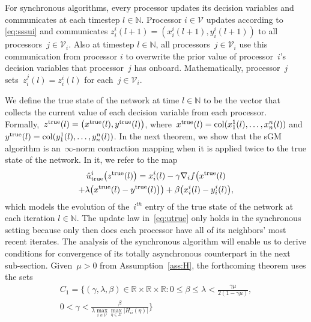 \documentclass[9pt,shortpaper,twoside,web]{ieeecolor}
\newcommand{\R}{\ensuremath{\mathbb{R}}\xspace}
\newcommand{\X}{\ensuremath{\mathcal{X}}\xspace}
\newcommand{\V}{\ensuremath{\mathcal{V}}\xspace}
\newcommand{\col}[2]{\textnormal{col}(#1,#2)}
\newcommand{\tr}{\textnormal{true}}
\begin{document}
For synchronous algorithms, every processor updates its decision variables and communicates at each timestep $l\in\mathbb{N}$.
Processor $i\in\V$ updates according to \eqref{eq:sssui} and communicates $z^i_i(l+1)=(x^i_i(l+1),y^i_i(l+1))$ to all 
processors~$j \in \V_i$.
Also at timestep $l\in\mathbb{N}$, all processors~$j \in \V_i$ use this communication from processor $i$ 
to overwrite the prior value of processor~$i$'s decision variables that processor~$j$ has onboard.
Mathematically, processor~$j$ sets~$z^j_i(l) = z^i_i(l)$ for each~$j \in \V_i$.

We define the true state of the network 
 at time $l\in\mathbb{N}$ to be the vector that collects the current value of each decision variable from each processor.
 Formally,~$z^\tr(l)= \big(x^\tr(l),y^\tr(l)\big)$, where~$x^\tr(l)=\col{x^1_1(l),\dots}{x^n_n(l)}$ and~$y^\tr(l) =\col{y^1_1(l),\dots}{y^n_n(l)}$.
In the next theorem, we show that the sGM algorithm is an~$\infty$-norm contraction mapping when it is applied
twice to the true state of the network.
In it, we refer to the map 
\begin{multline}\label{eq:utrue}
    \hat{u}^i_\tr\big(z^\tr(l)\big) = x^i_i(l)-\gamma\nabla_i f\big(x^\tr(l)\\+\lambda\big(x^\tr(l)-y^\tr(l)\big)\big) + \beta\big(x^i_i(l)-y^i_i(l)\big),
\end{multline}
which models the evolution of the~$i^{th}$ entry of the true state of the network at each iteration $l\in\mathbb{N}$.
The update law in~\eqref{eq:utrue} 
only holds in the synchronous setting
because only then does each processor have all of its neighbors' most recent iterates. 
The analysis of the synchronous algorithm will enable us to derive
conditions for convergence of its totally asynchronous counterpart
in the next sub-section.
Given~$\mu > 0$ from Assumption~\ref{ass:H}, 
the forthcoming theorem uses the sets
    \begin{multline}\label{eq:C1}
        C_1=\bigg\{(\gamma,\lambda,\beta)\in\R\times\R\times \R : 
        0 \leq \beta\leq \lambda< \frac{\gamma\mu}{2(1-\gamma\mu)}, 
        \\0<\gamma < \frac{\beta}{\lambda \max\limits_{i\in\V}\max\limits_{\eta\in\X}\vert H_{ii}(\eta)\vert} \bigg\}
        \end{multline}
\end{document}
